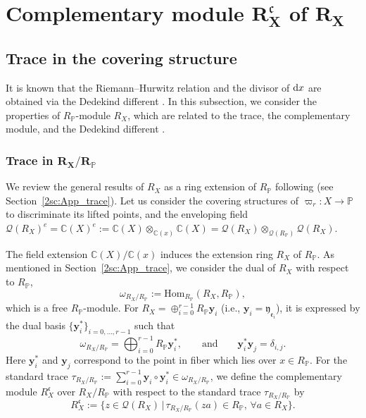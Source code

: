 \documentclass[pdftex]{sigma}
\def\CC{{\mathbb C}}
\def\PP{{\mathbb P}}
\def\bby{{\mathbf y}}
\def\cQ{{\mathcal Q}}
\def\fc{{\mathfrak c}}
\def\fe{{\mathfrak e}}
\def\fy{{\mathfrak y}}
\def\Hom{\mathrm{Hom}}
\numberwithin{equation}{section}
\begin{document}
\section[Complementary module R\_X\^{}c of R\_X]{Complementary module $\boldsymbol{R_X^\fc}$ of $\boldsymbol{R_X}$}\label{sec:CompM}

\subsection{Trace in the covering structure}\label{2ssc:TraceOperator}

It is known that the Riemann--Hurwitz relation and the divisor of ${\rm d} x$ are obtained via the Dedekind different \cite[Theorem~15.11]{Kunz2004}.
In this subsection, we consider the properties of $R_\PP$-module $R_X$, which are related to the trace, the complementary module, and the Dedekind different \cite[Chapter~15]{Kunz2004}.

\subsubsection[Trace in R\_X/R\_P]{Trace in $\boldsymbol{R_X/R_\PP}$}

We review the general results of $R_X$ as a ring extension of $R_\PP$ following \cite{Kunz2004} (see Section~\ref{2sc:App_trace}).
Let us consider the covering structures of $\varpi_r\colon X\to \PP$ to discriminate its lifted points, and the enveloping field $\cQ(R_X)^e=\CC(X)^e:=\CC(X)\otimes_{\CC(x)}\CC(X)=\cQ(R_X) \otimes_{\cQ(R_\PP)} \cQ(R_X)$.

The field extension $\CC(X)/\CC(x)$ induces the extension ring $R_X$ of $R_\PP$.
As mentioned in Section~\ref{2sc:App_trace}, we consider the dual of $R_X$ with respect to $R_\PP$,
\[
\omega_{R_X/R_\PP}:=\Hom_{R_\PP}(R_X, R_\PP),
\]
which is a free $R_\PP$-module.
For $R_X= \oplus_{i=0}^{r-1} R_\PP \bby_i$ (i.e., $\bby_i=\fy_{\fe_i}$), it is expressed by the dual basis $\{\bby_i^*\}_{i=0, \dots, r-1}$ such that
\begin{equation*}
\omega_{R_X/R_\PP}=\bigoplus_{i=0}^{r-1} R_\PP {\mathbf{y}_i^*},
\qquad\text{and}\qquad
\bby_i^* \bby_j = \delta_{i,j}.%
\end{equation*}
Here $\bby_i^*$ and $\bby_j$ correspond to the point in fiber which lies over $x\in R_\PP$.
For the standard trace $\tau_{R_X/R_\PP}:=\sum_{i=0}^{r-1} \bby_i \circ \bby_i^*\in \omega_{R_X/R_\PP}$, we define the complementary module $R_{X}^{\fc}$ over $R_X/R_\PP$ with respect to the standard trace $\tau_{R_X/R_\PP}$ by
\begin{equation}
R_{X}^{\fc}:=\{z \in \cQ(R_X)\, | \, \tau_{R_X/R_\PP}(z a) \in R_\PP, \, \forall a \in R_X\}.\label{2eq:RXc_tau}
\end{equation}
\end{document}
